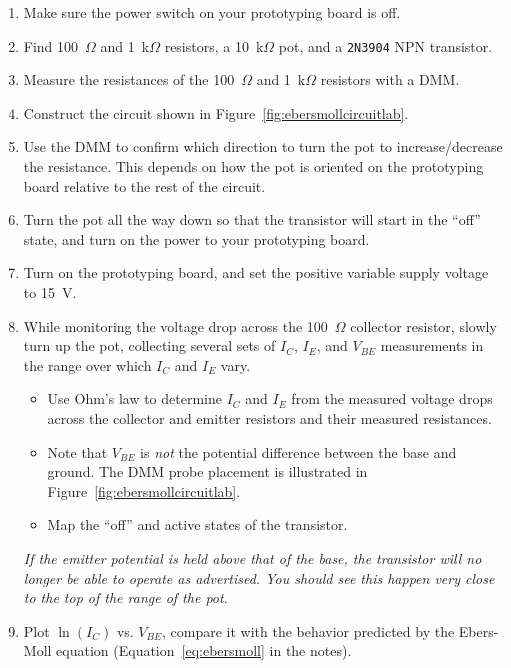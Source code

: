 \documentclass[11pt]{article}
\begin{document}
\begin{enumerate}
\item Make sure the power switch on your prototyping board is off.

\item Find 100~$\Omega$ and 1~k$\Omega$ resistors, a 10~k$\Omega$ pot,
  and a \texttt{2N3904} NPN transistor.

\item Measure the resistances of the 100~$\Omega$ and 1~k$\Omega$
  resistors with a DMM.
  
\item Construct the circuit shown in
  Figure~\ref{fig:ebersmollcircuitlab}. 

\item Use the DMM to confirm which direction to turn the pot to
  increase/decrease the resistance. This depends on how the pot is
  oriented on the prototyping board relative to the rest of the
  circuit.
  
\item Turn the pot all the way down so that the transistor will start
  in the ``off'' state, and turn on the power to your prototyping 
  board.

\item Turn on the prototyping board, and set the positive variable
  supply voltage to 15~V.

\item While monitoring the voltage drop across the 100~$\Omega$
  collector resistor, slowly turn up the pot, collecting several sets
  of $I_C$, $I_E$, and $V_{BE}$ measurements in the range over which
  $I_C$ and $I_E$ vary.
  \begin{itemize}
  \item Use Ohm's law to determine $I_C$ and $I_E$ from the measured
    voltage drops across the collector and emitter resistors and their
    measured resistances.
  \item Note that $V_{BE}$ is \emph{not} the potential difference
    between the base and ground. The DMM probe placement is
    illustrated in Figure~\ref{fig:ebersmollcircuitlab}.
  \item Map the ``off'' and active states of the transistor. 
  \end{itemize}
  \emph{If the emitter potential is held above that of the base, the
    transistor will no longer be able to operate as advertised. You
    should see this happen very close to the top of the range of the
    pot.}

\item Plot $\ln(I_C)$ vs. $V_{BE}$, compare it with the behavior
  predicted by the Ebers-Moll equation (Equation~\ref{eq:ebersmoll} in
  the notes).


\end{enumerate}
\end{document}
